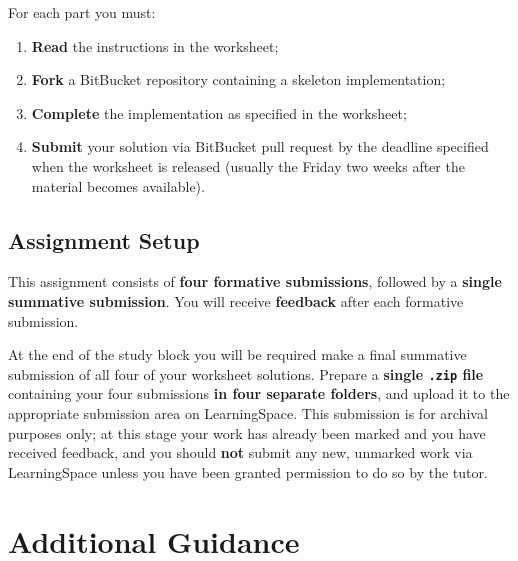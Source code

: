 \documentclass{../../fal_assignment}
\begin{document}
For each part you must:
\begin{enumerate}[label=(\roman*)]
	\item \textbf{Read} the instructions in the worksheet;
	\item \textbf{Fork} a BitBucket repository containing a skeleton implementation;
	\item \textbf{Complete} the implementation as specified in the worksheet;
	\item \textbf{Submit} your solution via BitBucket pull request by the deadline specified when the worksheet is released (usually the Friday two weeks after the material becomes available).
\end{enumerate}

\subsection*{Assignment Setup} 

This assignment consists of \textbf{four formative submissions}, followed by a \textbf{single summative submission}.
You will receive \textbf{feedback} after each formative submission.

At the end of the study block you will be required make a final summative submission of all four of your worksheet solutions.
Prepare a \textbf{single \texttt{.zip} file} containing your four submissions \textbf{in four separate folders}, and upload it to the appropriate submission area on LearningSpace. 
This submission is for archival purposes only; at this stage your work has already been marked and you have received feedback, and you should \textbf{not} submit any new, unmarked work via LearningSpace unless you have been granted permission to do so by the tutor.

\paragraph{}

\section*{Additional Guidance}
\end{document}
